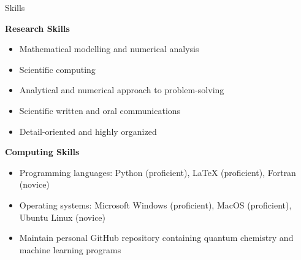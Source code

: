 \documentclass{resume} %
\begin{document}
\begin{rSection}{Skills}

{\bf{Research Skills}}
\begin{itemize}
    \item Mathematical modelling and numerical analysis
    \item Scientific computing
    \item Analytical and numerical approach to problem-solving 
    \item Scientific written and oral communications
    \item Detail-oriented and highly organized
\end{itemize}

{\bf{Computing Skills}}
\begin{itemize}
\item Programming languages: Python (proficient), LaTeX (proficient), Fortran (novice)
\item Operating systems: Microsoft Windows (proficient), MacOS (proficient), Ubuntu Linux (novice)
\item Maintain personal GitHub repository containing quantum chemistry and machine learning programs
\end{itemize}

\end{rSection}

\vspace{1em}
\end{document}
